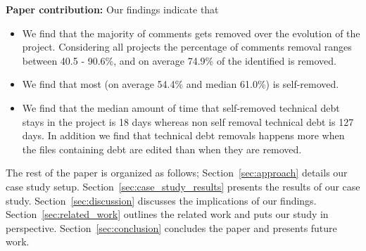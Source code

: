 \textbf{Paper contribution:} Our findings indicate that 
\begin{itemize}
	\item We find that the majority of \SATD comments gets removed over the evolution of the project. Considering all projects the percentage of \SATD comments removal ranges between 40.5 - 90.6\%, and on average 74.9\% of the identified \SATD is removed.
	\item We find that most \SATD (on average 54.4\% and median 61.0\%) is self-removed.
	\item We find that the median amount of time that self-removed technical debt stays in the project is 18 days whereas non self removal technical debt is 127 days. In addition we find that technical debt removals happens more when the files containing debt are edited than when they are removed.
\end{itemize}

The rest of the paper is organized as follows; Section~\ref{sec:approach} details our case study setup. Section~\ref{sec:case_study_results} presents the results of our case study. Section~\ref{sec:discussion} discusses the implications of our findings. Section~\ref{sec:related_work} outlines the related work and puts our study in perspective. Section~\ref{sec:conclusion} concludes the paper and presents future work.





